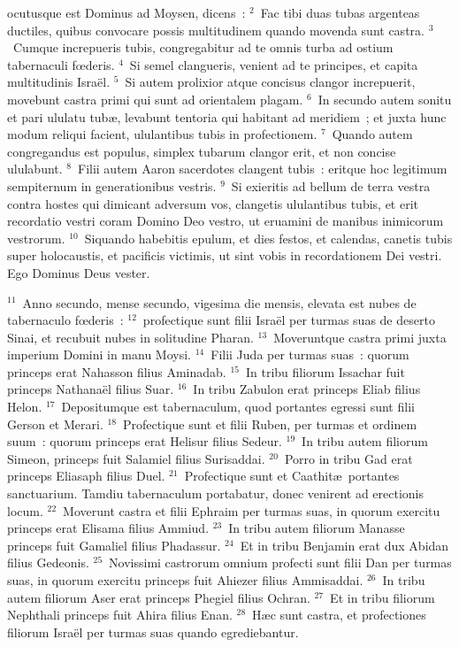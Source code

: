 \bchapter
{}ocutusque est Dominus ad Moysen, dicens~:
${}^{2}$~Fac tibi duas tubas argenteas ductiles, quibus convocare possis multitudinem quando movenda sunt castra.
${}^{3}$~Cumque increpueris tubis, congregabitur ad te omnis turba ad ostium tabernaculi fœderis.
${}^{4}$~Si semel clangueris, venient ad te principes, et capita multitudinis Isra\"el.
${}^{5}$~Si autem prolixior atque concisus clangor increpuerit, movebunt castra primi qui sunt ad orientalem plagam.
${}^{6}$~In secundo autem sonitu et pari ululatu tub\ae , levabunt tentoria qui habitant ad meridiem~; et juxta hunc modum reliqui facient, ululantibus tubis in profectionem.
${}^{7}$~Quando autem congregandus est populus, simplex tubarum clangor erit, et non concise ululabunt.
${}^{8}$~Filii autem Aaron sacerdotes clangent tubis~: eritque hoc legitimum sempiternum in generationibus vestris.
${}^{9}$~Si exieritis ad bellum de terra vestra contra hostes qui dimicant adversum vos, clangetis ululantibus tubis, et erit recordatio vestri coram Domino Deo vestro, ut eruamini de manibus inimicorum vestrorum.
${}^{10}$~Siquando habebitis epulum, et dies festos, et calendas, canetis tubis super holocaustis, et pacificis victimis, ut sint vobis in recordationem Dei vestri. Ego Dominus Deus vester.


${}^{11}$~Anno secundo, mense secundo, vigesima die mensis, elevata est nubes de tabernaculo fœderis~:
${}^{12}$~profectique sunt filii Isra\"el per turmas suas de deserto Sinai, et recubuit nubes in solitudine Pharan.
${}^{13}$~Moveruntque castra primi juxta imperium Domini in manu Moysi.
${}^{14}$~Filii Juda per turmas suas~: quorum princeps erat Nahasson filius Aminadab.
${}^{15}$~In tribu filiorum Issachar fuit princeps Nathana\"el filius Suar.
${}^{16}$~In tribu Zabulon erat princeps Eliab filius Helon.
${}^{17}$~Depositumque est tabernaculum, quod portantes egressi sunt filii Gerson et Merari.
${}^{18}$~Profectique sunt et filii Ruben, per turmas et ordinem suum~: quorum princeps erat Helisur filius Sedeur.
${}^{19}$~In tribu autem filiorum Simeon, princeps fuit Salamiel filius Surisaddai.
${}^{20}$~Porro in tribu Gad erat princeps Eliasaph filius Duel.
${}^{21}$~Profectique sunt et Caathit\ae\ portantes sanctuarium. Tamdiu tabernaculum portabatur, donec venirent ad erectionis locum.
${}^{22}$~Moverunt castra et filii Ephraim per turmas suas, in quorum exercitu princeps erat Elisama filius Ammiud.
${}^{23}$~In tribu autem filiorum Manasse princeps fuit Gamaliel filius Phadassur.
${}^{24}$~Et in tribu Benjamin erat dux Abidan filius Gedeonis.
${}^{25}$~Novissimi castrorum omnium profecti sunt filii Dan per turmas suas, in quorum exercitu princeps fuit Ahiezer filius Ammisaddai.
${}^{26}$~In tribu autem filiorum Aser erat princeps Phegiel filius Ochran.
${}^{27}$~Et in tribu filiorum Nephthali princeps fuit Ahira filius Enan.
${}^{28}$~H\ae c sunt castra, et profectiones filiorum Isra\"el per turmas suas quando egrediebantur.


